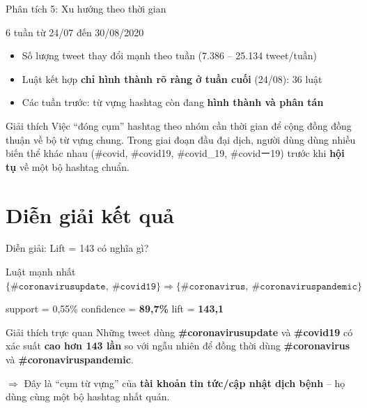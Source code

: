 \documentclass[aspectratio=169]{beamer}
\begin{document}
\begin{frame}{Phân tích 5: Xu hướng theo thời gian}
  \begin{block}{6 tuần từ 24/07 đến 30/08/2020}
    \begin{itemize}
      \item Số lượng tweet thay đổi mạnh theo tuần (7.386 -- 25.134 tweet/tuần)
      \item Luật kết hợp \textbf{chỉ hình thành rõ ràng ở tuần cuối} (24/08): 36 luật
      \item Các tuần trước: từ vựng hashtag còn đang \textbf{hình thành và phân tán}
    \end{itemize}
  \end{block}

  \vspace{0.3em}
  \begin{alertblock}{Giải thích}
    Việc ``đóng cụm'' hashtag theo nhóm cần thời gian để cộng đồng đồng thuận về bộ từ vựng chung. Trong giai đoạn đầu đại dịch, người dùng dùng nhiều biến thể khác nhau (\#covid, \#covid19, \#covid\_19, \#covidー19) trước khi \textbf{hội tụ} về một bộ hashtag chuẩn.
  \end{alertblock}
\end{frame}

\section{Diễn giải kết quả}

\begin{frame}{Diễn giải: Lift = 143 có nghĩa gì?}
  \begin{block}{Luật mạnh nhất}
    \centering
    \Large
    $\{\texttt{\#coronavirusupdate},\ \texttt{\#covid19}\} \Rightarrow \{\texttt{\#coronavirus},\ \texttt{\#coronaviruspandemic}\}$

    \normalsize
    \vspace{0.3em}
    support = 0,55\% \quad confidence = \textbf{89,7\%} \quad lift = \textbf{143,1}
  \end{block}

  \vspace{0.5em}

  \begin{exampleblock}{Giải thích trực quan}
    Những tweet dùng \textbf{\#coronavirusupdate} và \textbf{\#covid19} có xác suất \textbf{cao hơn 143 lần} so với ngẫu nhiên để đồng thời dùng \textbf{\#coronavirus} và \textbf{\#coronaviruspandemic}.

    \vspace{0.3em}
    $\Rightarrow$ Đây là ``cụm từ vựng'' của \textbf{tài khoản tin tức/cập nhật dịch bệnh} -- họ dùng cùng một bộ hashtag nhất quán.
  \end{exampleblock}
\end{frame}
\end{document}
